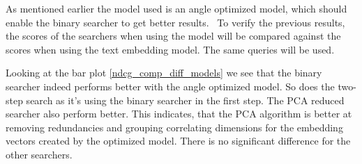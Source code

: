 As mentioned earlier the model used is an angle optimized model, which should enable the binary searcher to get better results.~\cite{emb2024mxbai,li2024angleoptimizedtextembeddings}
To verify the previous results, the scores of the searchers when using the \texttt{} model will be compared against the scores when using the \texttt{} text embedding model. The same queries will be used.

Looking at the bar plot \autoref{ndcg_comp_diff_models} we see that the binary searcher indeed performs better with the angle optimized model. So does the two-step search as it's using the binary searcher in the first step. The PCA reduced searcher also perform better. This indicates, that the PCA algorithm is better at removing redundancies and grouping correlating dimensions for the embedding vectors created by the optimized model. There is no significant difference for the other searchers.

